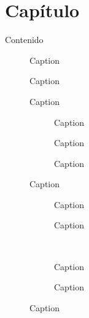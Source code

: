 \chapter{Capítulo}

Contenido

\begin{figure}
\centering
\marco
\sombra
{}
\caption{Caption}
\end{figure}

\begin{figure}
\centering
{}
\caption{Caption}
\end{figure}

\begin{figure}
\centering\marco\sombra
{}
\caption{Caption}
\end{figure}

\begin{figure}
	\begin{subfigure}[b]{0.29\textwidth}
		\centering
		\caption{Caption}
		\label{label1}
	\end{subfigure}\qquad
	\begin{subfigure}[b]{0.29\textwidth}
		\centering\marco
		\caption{Caption}
		\label{label2}
	\end{subfigure}\qquad
	\begin{subfigure}[b]{0.29\textwidth}
		\centering\sombra\marco
		\caption{Caption}
		\label{label3}
	\end{subfigure}	
	\caption{Caption}
\end{figure}

\begin{figure}
	\centering
	\begin{subfigure}[b]{0.45\textwidth}
		\centering
		\caption{Caption}
		\label{label4}
	\end{subfigure}\qquad
	\begin{subfigure}[b]{0.45\textwidth}
		\centering\marco
		\caption{Caption}
		\label{label}
	\end{subfigure}\\
	\begin{subfigure}[b]{0.45\textwidth}
		\centering\sombra
		\caption{Caption}
		\label{label5}
	\end{subfigure}\qquad
	\begin{subfigure}[b]{0.45\textwidth}
		\centering\sombra\marco
		\caption{Caption}
		\label{label6}
	\end{subfigure}	
	\caption{Caption}
\end{figure}

